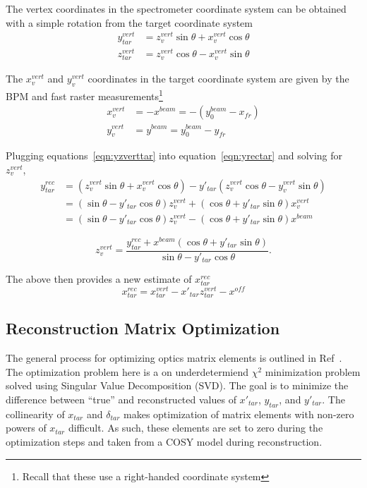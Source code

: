 The vertex coordinates in the spectrometer coordinate system can be obtained
with a simple rotation from the target coordinate system
\begin{align} \label{eqn:yzverttar}
    y^{vert}_{tar} &= z^{vert}_v \sin\theta + x^{vert}_v \cos\theta \\
    z^{vert}_{tar} &= z^{vert}_v \cos\theta - x^{vert}_v \sin\theta
\end{align}

The $x^{vert}_{v}$ and $y^{vert}_{v}$ coordinates in the
target coordinate system are given by the BPM and fast raster
measurements\footnote{Recall that these use a right-handed coordinate system}
\begin{align}
    x^{vert}_v &= -x^{beam} = -(y_0^{beam} - x_{fr}) \\
    y^{vert}_v &= y^{beam} = y_0^{beam} - y_{fr}
\end{align}

Plugging equations~\ref{eqn:yzverttar} into equation~\ref{eqn:yrectar} and
solving for $z^{vert}_v$,
\begin{align}
    y^{rec}_{tar} &= (z^{vert}_v \sin\theta + x^{vert}_v \cos\theta) -
                     y'_{tar} (z^{vert}_v \cos\theta - y^{vert}_v \sin\theta) \\
                  &= (\sin\theta-y'_{tar}\cos\theta)z^{vert}_v +
                     (\cos\theta + y'_{tar} \sin\theta) x^{vert}_v \\
                  &= (\sin\theta-y'_{tar}\cos\theta)z^{vert}_v -
                     (\cos\theta + y'_{tar} \sin\theta) x^{beam}
\end{align}

\begin{equation}
    z^{vert}_v = \frac{y^{rec}_{tar} + x^{beam} (\cos\theta + y'_{tar} \sin\theta)}
                      {\sin\theta - y'_{tar}\cos\theta}.
\end{equation}

The above then provides a new estimate of $x^{rec}_{tar}$
\begin{equation}
    x^{rec}_{tar} = x^{vert}_{tar} - x'_{tar}z^{vert}_{tar} - x^{off}
\end{equation}

\subsection{Reconstruction Matrix Optimization}
The general process for optimizing optics matrix elements is outlined in
Ref~\cite{Bericic_2017}.
The optimization problem here is a on underdetermiend $\chi^2$ minimization
problem solved using Singular Value Decomposition (SVD).
The goal is to minimize the difference between ``true'' and reconstructed
values of $x'_{tar}$, $y_{tar}$, and $y'_{tar}$.
The collinearity of $x_{tar}$ and $\delta_{tar}$ makes optimization of matrix
elements with non-zero powers of $x_{tar}$ difficult.
As such, these elements are set to zero during the optimization steps and taken
from a COSY model during reconstruction.


